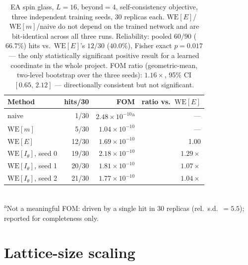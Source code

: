 \documentclass[11pt]{article}
\begin{document}
\begin{table}[h]
	\centering\small
	\caption{EA spin glass, $L=16$, $\mathrm{beyond}=4$, self-consistency objective,
		three independent training seeds, 30 replicas each. $\mathrm{WE}[E]$/$\mathrm{WE}[m]$/naive
		do not depend on the trained network and are bit-identical across all three runs.
		Reliability: pooled $60/90$ ($66.7\%$) hits vs.\ $\mathrm{WE}[E]$'s $12/30$ ($40.0\%$),
		Fisher exact $p=0.017$ --- the only statistically significant positive result for a
		learned coordinate in the whole project. FOM ratio (geometric-mean, two-level bootstrap
		over the three seeds): $1.16\times$, 95\% CI $[0.65,\,2.12]$ --- directionally consistent
		but not significant.}
	\label{tab:selfconsistdeep}
	\begin{tabular}{lrrr}
		\toprule
		Method & hits/30 & FOM & ratio vs.\ $\mathrm{WE}[E]$ \\
		\midrule
		naive & 1/30 & $2.48\times10^{-10}$\textsuperscript{a} & --- \\
		$\mathrm{WE}[m]$ & 5/30 & $1.04\times10^{-10}$ & --- \\
		$\mathrm{WE}[E]$ & 12/30 & $1.69\times10^{-10}$ & 1.00 \\
		$\mathrm{WE}[I_\theta]$, seed 0 & 19/30 & $2.18\times10^{-10}$ & $1.29\times$ \\
		$\mathrm{WE}[I_\theta]$, seed 1 & 20/30 & $1.81\times10^{-10}$ & $1.07\times$ \\
		$\mathrm{WE}[I_\theta]$, seed 2 & 21/30 & $1.77\times10^{-10}$ & $1.04\times$ \\
		\bottomrule
	\end{tabular}
	\\[2pt]
	{\footnotesize\textsuperscript{a}Not a meaningful FOM: driven by a single hit in 30
		replicas (rel.\ s.d.\ $=5.5$); reported for completeness only.}
\end{table}

\section{Lattice-size scaling}
\end{document}
